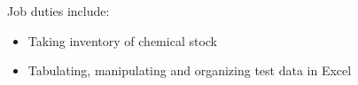 \normalsize
Job duties include:
\small
\begin{itemize}
    \item Taking inventory of chemical stock
    \item Tabulating, manipulating and organizing test data in Excel
\end{itemize}
\normalsize
\medskip
